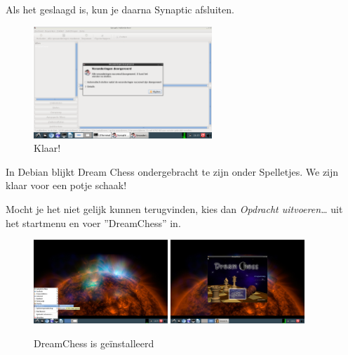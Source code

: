 \documentclass[12pt,a4paper]{article}
\begin{document}
\clearpage

Als het geslaagd is, kun je daarna Synaptic afsluiten.

\begin{figure} [H]
\centering
\includegraphics[width=0.6\textwidth]{plaatje13}
\caption{Klaar!}
\label{plaatje13}
\end{figure}

In Debian blijkt Dream Chess ondergebracht te zijn onder Spelletjes. We zijn klaar voor een potje schaak!

Mocht je het niet gelijk kunnen terugvinden, kies dan \emph{Opdracht uitvoeren\ldots} uit het startmenu en voer ''DreamChess'' in.

\begin{figure} [H]
\centering
\includegraphics[width=0.45\textwidth]{plaatje14}
\includegraphics[width=0.45\textwidth]{plaatje15}
\caption{DreamChess is ge\"{i}nstalleerd}
\label{plaatje14}
\end{figure}
\end{document}
